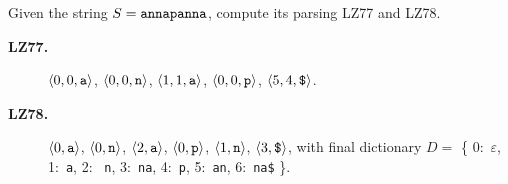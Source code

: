 \exercise

Given the string $S = \text{\tt annapanna}$, compute its parsing LZ77 and LZ78.

\solution

\begin{description}

  \item[\bf LZ77.]  $\langle 0, 0, \text{\tt a}\rangle$, $\langle 0, 0,
  \text{\tt n}\rangle$, $\langle 1, 1, \text{\tt a}\rangle$, $\langle 0, 0,
  \text{\tt p}\rangle$, $\langle 5, 4, \text{\tt \$}\rangle$.

  \item[\bf LZ78.] $\langle 0, \text{\tt a}\rangle$, $\langle 0, \text{\tt
  n}\rangle$, $\langle 2, \text{\tt a}\rangle$, $\langle 0, \text{\tt
  p}\rangle$, $\langle 1, \text{\tt n}\rangle$, $\langle 3, \text{\tt
  \$}\rangle$, with final dictionary $D = $ \{ 0:~$\varepsilon$, 1:~{\tt a}, 2: {\tt
  n}, 3:~{\tt na}, 4:~{\tt p}, 5:~{\tt an}, 6:~{\tt na\$} \}.

\end{description}
